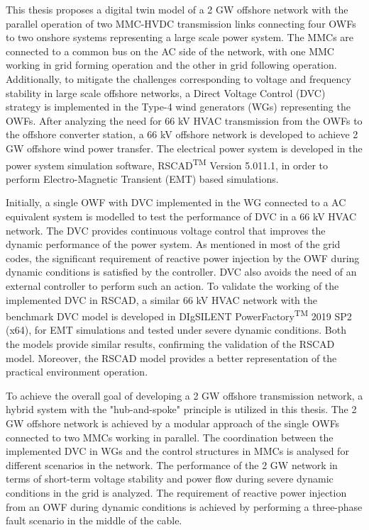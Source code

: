 This thesis proposes a digital twin model of a 2 GW offshore network with the parallel operation of two MMC-HVDC transmission links connecting four OWFs to two onshore systems representing a large scale power system. The MMCs are connected to a common bus on the AC side of the network, with one MMC working in grid forming operation and the other in grid following operation. Additionally, to mitigate the challenges corresponding to voltage and frequency stability in large scale offshore networks, a Direct Voltage Control (DVC) strategy is implemented in the Type-4 wind generators (WGs) representing the OWFs. After analyzing the need for 66 kV HVAC transmission from the OWFs to the offshore converter station, a 66 kV offshore network is developed to achieve 2 GW offshore wind power transfer. The electrical power system is developed in the power system simulation software, RSCAD\textsuperscript{TM} Version 5.011.1, in order to perform Electro-Magnetic Transient (EMT) based simulations. 

Initially, a single OWF with DVC implemented in the WG connected to a AC equivalent system is modelled to test the performance of DVC in a 66 kV HVAC network. The DVC provides continuous voltage control that improves the dynamic performance of the power system. As mentioned in most of the grid codes, the significant requirement of reactive power injection by the OWF during dynamic conditions is satisfied by the controller. DVC also avoids the need of an external controller to perform such an action. To validate the working of the implemented DVC in RSCAD, a similar 66 kV HVAC network with the benchmark DVC model is developed in DIgSILENT PowerFactory\textsuperscript{TM} 2019 SP2 (x64), for EMT simulations and tested under severe dynamic conditions. Both the models provide similar results, confirming the validation of the RSCAD model. Moreover, the RSCAD model provides a better representation of the practical environment operation. 

To achieve the overall goal of developing a 2 GW offshore transmission network, a hybrid system with the "hub-and-spoke" principle is utilized in this thesis. The 2 GW offshore network is achieved by a modular approach of the single OWFs connected to two MMCs working in parallel. The coordination between the implemented DVC in WGs and the control structures in MMCs is analysed for different scenarios in the network. The performance of the 2 GW network in terms of short-term voltage stability and power flow during severe dynamic conditions in the grid is analyzed. The requirement of reactive power injection from an OWF during dynamic conditions is achieved by performing a three-phase fault scenario in the middle of the cable. 
